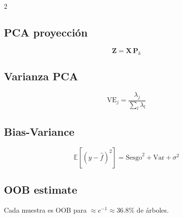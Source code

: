 \documentclass[12pt, a4paper]{article}
\newcommand{\E}{\mathbb{E}}
\begin{document}
\begin{multicols}{2}
	\subsection*{PCA proyección}
	\[
		\mathbf{Z} = \mathbf{X}\,\mathbf{P}_k
	\]

	\subsection*{Varianza PCA}
	\[
		\text{VE}_j = \frac{\lambda_j}{\sum_l \lambda_l}
	\]

	\subsection*{Bias-Variance}
	\[
		\E[(y-\hat{f})^2] = \text{Sesgo}^2 + \text{Var} + \sigma^2
	\]

	\subsection*{OOB estimate}
	Cada muestra es OOB para $\approx e^{-1} \approx 36.8\%$ de árboles.
\end{multicols}
\end{document}

